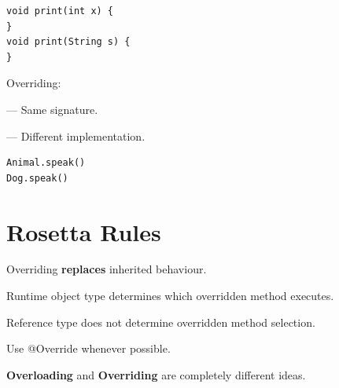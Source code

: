 \documentclass[11pt,a4paper]{book}
\begin{document}

\begin{verbatim}
void print(int x) {
}
void print(String s) {
}
\end{verbatim}


Overriding:

--- Same \textcolor{RosettaSeaGreen}{signature}.

--- Different \textcolor{RosettaRoyalPurple}{implementation}.


\begin{verbatim}
Animal.speak()
Dog.speak()
\end{verbatim}


\section{Rosetta Rules}

\begin{rosettarule}

Overriding \textbf{replaces} inherited behaviour.

\end{rosettarule}

\begin{rosettarule}

\textcolor{RosettaOrange}{Runtime} \textcolor{RosettaRoyalPurple}{object type} determines
which overridden method executes.

\end{rosettarule}

\begin{rosettarule}

Reference type does not determine
overridden method selection.

\end{rosettarule}

\begin{rosettarule}

Use @Override whenever possible.

\end{rosettarule}

\begin{rosettarule}

\textbf{Overloading} and \textbf{Overriding}
are \textcolor{RosettaRed}{completely different} ideas.

\end{rosettarule}
\end{document}
